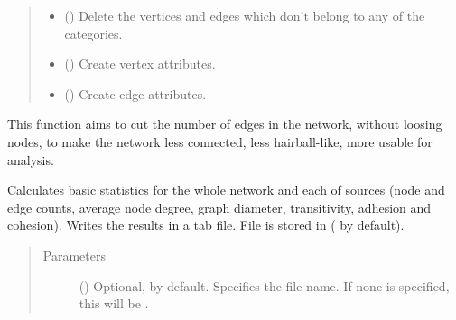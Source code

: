 \documentclass[letterpaper,10pt,english]{sphinxmanual}
\begin{document}
\begin{fulllineitems}
\begin{fulllineitems}
\begin{quote}
\begin{description}
\begin{itemize}
\item {} 
 () \textendash{} Delete the vertices and edges which don’t belong to any of the
categories.

\item {} 
 () \textendash{} Create vertex attributes.

\item {} 
 () \textendash{} Create edge attributes.

\end{itemize}

\end{description}\end{quote}

\end{fulllineitems}


\begin{fulllineitems}
\label{\detokenize{main:pypath.main.PyPath.network_filter}}
This function aims to cut the number of edges in the network,
without loosing nodes, to make the network less connected,
less hairball-like, more usable for analysis.

\end{fulllineitems}


\begin{fulllineitems}
\label{\detokenize{main:pypath.main.PyPath.network_stats}}
Calculates basic statistics for the whole network and each of
sources (node and edge counts, average node degree, graph
diameter, transitivity, adhesion and cohesion). Writes the
results in a tab file. File is stored in
 ( by default).
\begin{quote}\begin{description}
\item[{Parameters}] \leavevmode
{} () \textendash{} Optional,  by default. Specifies the file name. If
none is specified, this will be
.


\end{description}
\end{quote}
\end{fulllineitems}
\end{fulllineitems}
\end{document}
